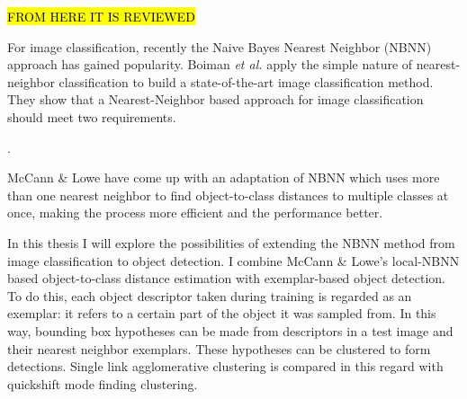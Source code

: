\begin{figure}[hbt]
    \centering
\end{figure}


\hl{FROM HERE IT IS REVIEWED}

For image classification, recently the Naive Bayes Nearest Neighbor (NBNN) \cite{boiman2008defense} approach has gained popularity.  Boiman \emph{et al.} apply the simple nature of nearest-neighbor classification to build a state-of-the-art image classification method. They show that a Nearest-Neighbor based approach for image classification should meet two requirements.

.


McCann \& Lowe \cite{mccann2012local} have come up with an adaptation of NBNN which uses more than one nearest neighbor to find object-to-class distances to multiple classes at once, making the process more efficient and the performance better. 

In this thesis I will explore the possibilities of extending the NBNN method from image classification to object detection. I combine McCann \& Lowe's local-NBNN based object-to-class distance estimation with exemplar-based object detection\cite{chum2007exemplar, becker2012codebook}. To do this, each object descriptor taken during training is regarded as an exemplar: it refers to a certain part of the object it was sampled from. In this way, bounding box hypotheses can be made from descriptors in a test image and their nearest neighbor exemplars. These hypotheses can be clustered to form detections. Single link agglomerative clustering is compared in this regard with quickshift mode finding clustering.

